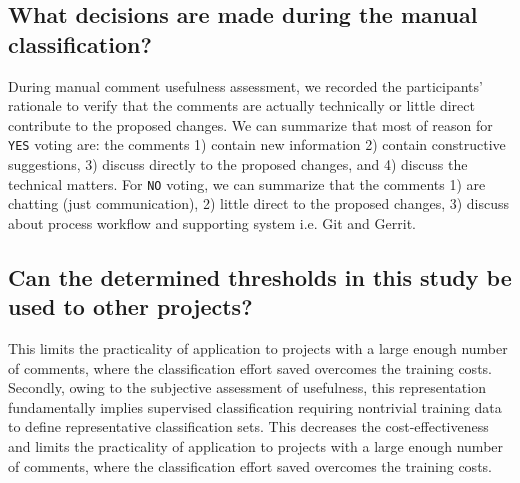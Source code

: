 \subsection{What decisions are made during the manual classification?}
During manual comment usefulness assessment, we recorded the participants' rationale to verify that the comments are actually technically or little direct contribute to the proposed changes. We can summarize that most of reason for \texttt{YES} voting are: the comments 1) contain new information 2) contain constructive suggestions, 3) discuss directly to the proposed changes, and 4) discuss the technical matters. For \texttt{NO} voting, we can summarize that the comments 1) are chatting (just communication), 2) little direct to the proposed changes, 3) discuss about process workflow and supporting system i.e. Git and Gerrit.
%
%
%

\subsection{Can the determined thresholds in this study be used to other projects?} 
This limits the practicality of application to projects with a large enough number of comments, where the classification effort saved overcomes the training costs.
Secondly, owing to the subjective assessment of usefulness, this representation fundamentally implies supervised classification requiring nontrivial training data to define representative classification sets. This decreases the cost-effectiveness and limits the practicality of application to projects with a large enough number of comments, where the classification effort saved overcomes the training costs.

